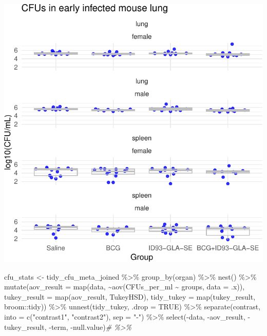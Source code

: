 \documentclass[
]{book}
\newenvironment{Shaded}{\begin{snugshade}}{\end{snugshade}}
\newcommand{\AttributeTok}[1]{\textcolor[rgb]{0.77,0.63,0.00}{#1}}
\newcommand{\CommentTok}[1]{\textcolor[rgb]{0.56,0.35,0.01}{\textit{#1}}}
\newcommand{\ConstantTok}[1]{\textcolor[rgb]{0.00,0.00,0.00}{#1}}
\newcommand{\FunctionTok}[1]{\textcolor[rgb]{0.00,0.00,0.00}{#1}}
\newcommand{\NormalTok}[1]{#1}
\newcommand{\OtherTok}[1]{\textcolor[rgb]{0.56,0.35,0.01}{#1}}
\newcommand{\SpecialCharTok}[1]{\textcolor[rgb]{0.00,0.00,0.00}{#1}}
\newcommand{\StringTok}[1]{\textcolor[rgb]{0.31,0.60,0.02}{#1}}
\begin{document}
\includegraphics{csu-impactb_files/figure-latex/unnamed-chunk-32-1.pdf}

\begin{Shaded}
\begin{Highlighting}[]
\NormalTok{cfu\_stats }\OtherTok{\textless{}{-}}\NormalTok{ tidy\_cfu\_meta\_joined }\SpecialCharTok{\%\textgreater{}\%} 
  \FunctionTok{group\_by}\NormalTok{(organ) }\SpecialCharTok{\%\textgreater{}\%}
  \FunctionTok{nest}\NormalTok{() }\SpecialCharTok{\%\textgreater{}\%}
  \FunctionTok{mutate}\NormalTok{(}\AttributeTok{aov\_result =} \FunctionTok{map}\NormalTok{(data, }\SpecialCharTok{\textasciitilde{}}\FunctionTok{aov}\NormalTok{(CFUs\_per\_ml }\SpecialCharTok{\textasciitilde{}}\NormalTok{ groups, }\AttributeTok{data =}\NormalTok{ .x)),}
         \AttributeTok{tukey\_result =} \FunctionTok{map}\NormalTok{(aov\_result, TukeyHSD),}
         \AttributeTok{tidy\_tukey =} \FunctionTok{map}\NormalTok{(tukey\_result, broom}\SpecialCharTok{::}\NormalTok{tidy)) }\SpecialCharTok{\%\textgreater{}\%}
  \FunctionTok{unnest}\NormalTok{(tidy\_tukey, }\AttributeTok{.drop =} \ConstantTok{TRUE}\NormalTok{) }\SpecialCharTok{\%\textgreater{}\%}
  \FunctionTok{separate}\NormalTok{(contrast, }\AttributeTok{into =} \FunctionTok{c}\NormalTok{(}\StringTok{"contrast1"}\NormalTok{, }\StringTok{"contrast2"}\NormalTok{), }\AttributeTok{sep =} \StringTok{"{-}"}\NormalTok{) }\SpecialCharTok{\%\textgreater{}\%}
  \FunctionTok{select}\NormalTok{(}\SpecialCharTok{{-}}\NormalTok{data, }\SpecialCharTok{{-}}\NormalTok{aov\_result, }\SpecialCharTok{{-}}\NormalTok{tukey\_result, }\SpecialCharTok{{-}}\NormalTok{term, }\SpecialCharTok{{-}}\NormalTok{null.value)}\CommentTok{\# \%\textgreater{}\%}
\end{Highlighting}
\end{Shaded}
\end{document}
